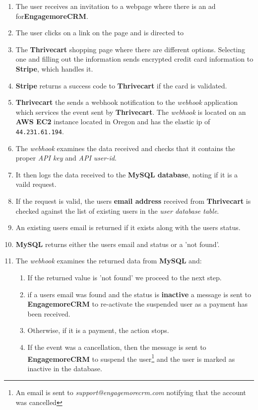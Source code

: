 \documentclass[final,letterpaper,12pt]{article}
\begin{document}
\begin{enumerate}
\item The user receives an invitation to a webpage where there is an ad for{\bf  EngagemoreCRM}.
\item The user clicks on a link on the page and is directed to
\item The {\bf Thrivecart} shopping page where there are different options. Selecting one and filling out the information sends encrypted credit card information to {\bf Stripe}, which handles it.
\item {\bf Stripe} returns a success code to {\bf Thrivecart} if the card is validated.
\item {\bf Thrivecart} the sends a webhook notification to the {\it webhook} application which services the event sent by {\bf Thrivecart}.  The {\it webhook} is located on an {\bf AWS EC2} instance located in Oregon and has the elastic ip of {\tt 44.231.61.194}.
\item The {\it webhook} examines the data received and checks that it contains the proper {\it API key} and {\it API user-id}.  
\item It then logs the data received to the {\bf MySQL database}, noting if it is a vaild request.
\item If the request is valid, the users {\bf email address} received from {\bf Thrivecart} is checked against the list of existing users in the {\it user database table}.
\item An existing users email is returned if it exists along with the users status.
\item {\bf MySQL} returns either the users email and status or a 'not found'.
\item The {\it webhook} examines the returned data from {\bf MySQL} and:
\begin{enumerate}
\item If the returned value is 'not found' we proceed to the next step.
\item if a users email was found and the status is {\bf inactive} a message is sent to {\bf EngagemoreCRM} to re-activate the suspended user as a payment has been received.  
\item Otherwise, if it is a payment, the action stops.  
\item If the event was a cancellation, then the message is sent to {\bf EngagemoreCRM} to suspend the user\footnote{An email is sent to {\it support@engagemorecrm.com} notifying that the account was cancelled} and the user is marked as inactive in the database.

\end{enumerate}
\end{enumerate}
\end{document}
